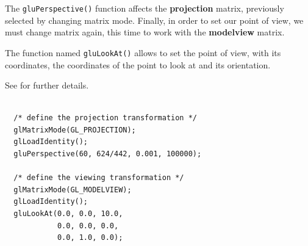 %
The \texttt{gluPerspective()} function affects the \textbf{projection} 
matrix, previously selected by changing matrix mode. Finally,
in order to set our point of view, we must change matrix again, 
this time to work with the \textbf{modelview} matrix.
%

%
The function named
\texttt{gluLookAt()} allows to set the point of view, with its coordinates, 
the coordinates of the point to look at and its orientation.
%

%
See \cite{opengl:gluLookAt} for further details.
%
\begin{lstlisting}[caption={OpenGL perspective example}, label={code:perspective}, frame=trBL]

  /* define the projection transformation */
  glMatrixMode(GL_PROJECTION);
  glLoadIdentity();
  gluPerspective(60, 624/442, 0.001, 100000);
  
  /* define the viewing transformation */
  glMatrixMode(GL_MODELVIEW);
  glLoadIdentity();
  gluLookAt(0.0, 0.0, 10.0,
            0.0, 0.0, 0.0,
            0.0, 1.0, 0.0);

\end{lstlisting}
